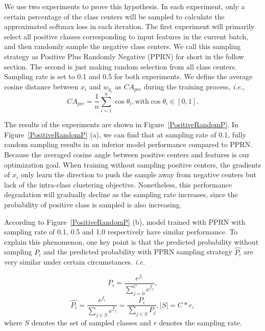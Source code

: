 \documentclass[letterpaper]{article} \usepackage{style/aaai21}  \usepackage{times}  \usepackage{helvet} \usepackage{courier}  \usepackage[hyphens]{url}  \usepackage{graphicx} \usepackage{color}
\begin{document}
We use two experiments to prove this hypothesis. In each experiment, only a certain percentage of the class centers will be sampled to calculate the approximated softmax loss in each iteration.
The first experiment will primarily select all positive classes corresponding to input features in the current batch, and then randomly sample the negative class centers. We call this sampling strategy as Positive Plus Randomly Negative (PPRN) for short in the follow section. The second is just making random selection from all class centers. Sampling rate is set to 0.1 and 0.5 for both experiments. We define the average cosine distance between $x_i$ and $w_{y_i}$ as $CA_{pcc}$ during the training process, \emph{i.e.}, 
\begin{equation}
CA_{pcc} = \frac{1}{n}\sum\limits_{i=1}^{n}\cos\theta_{i}, \text{with} \cos\theta_{i}\in [0, 1].
\end{equation}

The results of the experiments are shown in Figure~\ref{PositiveRandomP}. In Figure~\ref{PositiveRandomP} (a), we can find that at sampling rate of 0.1, fully random sampling results in an inferior model performance compared to PPRN. Because the averaged cosine angle between positive centers and features is our optimization goal. When training without sampling positive centers, the gradients of $x_i$ only learn the direction to push the sample away from negative centers but lack of the intra-class 
clustering objective. Nonetheless, this performance degradation will gradually decline as the sampling rate increases, since the probability of positive class is sampled is also increasing.

According to Figure~\ref{PositiveRandomP} (b), model trained with PPRN with
sampling rate of 0.1, 0.5 and 1.0 respectively 
 have similar performance. To explain this phenomenon, one key point is that the predicted probability without sampling $P_i$ and the predicted probability with PPRN sampling strategy $\hat{P_i}$ are very similar under certain circumstances. \emph{i.e.} 
 
\begin{equation}
    P_i=\frac{e^{f_i}}{\sum_{j=0}^{C}{e^{f_j}}},
\end{equation}
\begin{equation}
\hat{P_i}=\frac{e^{f_i}}{\sum_{j\in S}{e^{f_j}}}=\frac{P_i}{\sum_{j \in S}{P_j}}, |S|=C*r,
\end{equation}
where $S$ denotes the set of sampled classes and $r$ denotes the sampling rate.
\end{document}
